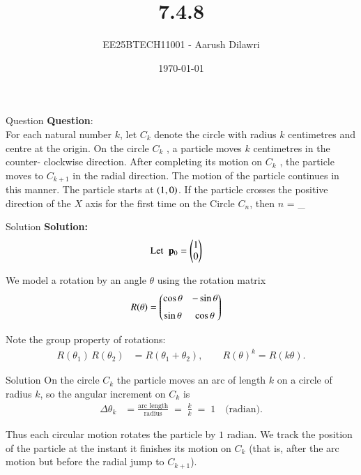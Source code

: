 \documentclass{beamer}
\title{7.4.8}
\date{\today}
\author{EE25BTECH11001 - Aarush Dilawri}
\begin{document}
\frame{\titlepage}

\begin{frame}{Question}
\textbf{Question}:\\
For each natural number $k$, let $C_k$ denote the circle with radius $k$ centimetres and
centre at the origin. On the circle $C_k$ , a particle moves $k$ centimetres in the counter-
clockwise direction. After completing its motion on $C_k$ , the particle moves to $C_{k+1}$ in the radial direction. The motion of the particle continues in this manner. The particle
starts at $\left(1,0\right)$. If the particle crosses the positive direction of the $X$ axis for the first time on the Circle $C_n$, then $n$ = \_
\end{frame}

\begin{frame}{Solution}
\textbf{Solution:} \\
\begin{align}
    \text{Let }\; \mathbf{p}_0 &= \begin{pmatrix}1 \\ 0\end{pmatrix} 
\end{align}

We model a rotation by an angle $\theta$ using the rotation matrix
\begin{align}
    R(\theta) &= \begin{pmatrix}\cos\theta & -\sin\theta \\[6pt] \sin\theta & \cos\theta\end{pmatrix}
\end{align}

Note the group property of rotations:
\begin{align}
    R(\theta_1)\,R(\theta_2) &= R(\theta_1+\theta_2),
    \qquad R(\theta)^k = R(k\theta).
\end{align}
\end{frame}

\begin{frame}{Solution}
On the circle $C_k$ the particle moves an arc of length $k$ on a circle of radius $k$, 
so the angular increment on $C_k$ is
\begin{align}
    \Delta\theta_k &= \frac{\text{arc length}}{\text{radius}} \;=\; \frac{k}{k} \;=\; 1 \quad\text{(radian).}
\end{align}

Thus each circular motion rotates the particle by $1$ radian.  We track the position of the particle at the instant it finishes its motion on $C_k$ (that is, after the arc motion but before the radial jump to $C_{k+1}$).  
\end{frame}
\end{document}
